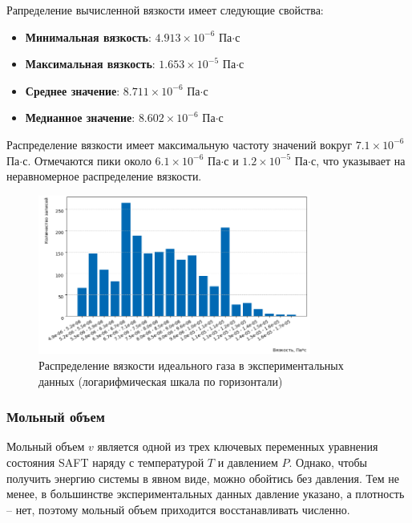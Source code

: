 \documentclass[a4paper,12pt]{article}
\begin{document}
      Рапределение вычисленной вязкости имеет следующие свойства:

      \begin{itemize}
          \item \textbf{Минимальная вязкость}: \(4.913 \times 10^{-6}\) Па\(\cdot\)с
          \item \textbf{Максимальная вязкость}: \(1.653 \times 10^{-5}\) Па\(\cdot\)с
          \item \textbf{Среднее значение}: \(8.711 \times 10^{-6}\) Па\(\cdot\)с
          \item \textbf{Медианное значение}: \(8.602 \times 10^{-6}\) Па\(\cdot\)с
      \end{itemize}
      
      Распределение вязкости имеет максимальную частоту значений вокруг \(7.1 \times 10^{-6}\) Па\(\cdot\)с.
      Отмечаются пики около \(6.1 \times 10^{-6}\) Па\(\cdot\)с и \(1.2 \times 10^{-5}\) Па\(\cdot\)с, что указывает на неравномерное распределение вязкости.
      
      \begin{figure}[ht!]
          \centering
          \includegraphics[width=0.8\textwidth]{data_distribution_viscosity_ideal_gas.png}
          \caption{Распределение вязкости идеального газа в экспериментальных данных (логарифмическая шкала по горизонтали)}
          \label{fig:data_distribution_viscosity_ideal_gas}
      \end{figure}

    \subsubsection{Мольный объем}
     
      Мольный объем \( v \) является одной из трех ключевых переменных уравнения состояния SAFT наряду с температурой \( T \) и давлением \( P \). Однако, чтобы получить энергию системы в явном виде, можно обойтись без давления. Тем не менее, в большинстве экспериментальных данных давление указано, а плотность -- нет, поэтому мольный объем приходится восстанавливать численно.
      
\end{document}
